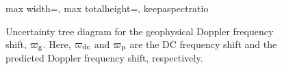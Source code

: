 \begin{figure}[p]
\begin{adjustbox}{max width=\textwidth, max totalheight=\textheight, keepaspectratio}
  \end{adjustbox}
  \caption{Uncertainty tree diagram for the geophysical Doppler frequency shift, $\varpi_{\rm g}$. Here, $\varpi_{\rm dc}$ and $\varpi_{\rm p}$ are the \ac{DC} frequency shift and the predicted Doppler frequency shift, respectively.}
  \label{fig:utd_varpi_g}
\end{figure}
